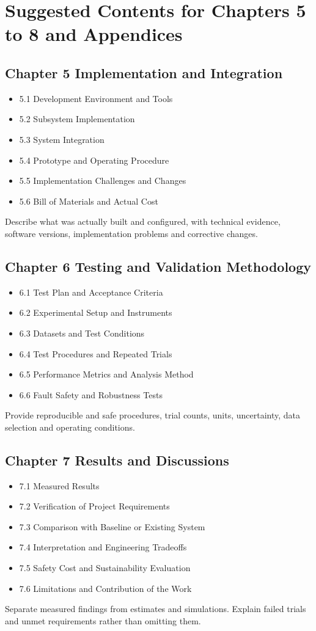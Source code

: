 \documentclass[11pt,a4paper]{article}
\newcommand{\Page}[1]{\clearpage\section*{#1}}
\begin{document}
\Page{Suggested Contents for Chapters 5 to 8 and Appendices}
\subsection*{Chapter 5 Implementation and Integration}
\begin{itemize}
\item 5.1 Development Environment and Tools
\item 5.2 Subsystem Implementation
\item 5.3 System Integration
\item 5.4 Prototype and Operating Procedure
\item 5.5 Implementation Challenges and Changes
\item 5.6 Bill of Materials and Actual Cost
\end{itemize}
Describe what was actually built and configured, with technical evidence,
software versions, implementation problems and corrective changes.

\subsection*{Chapter 6 Testing and Validation Methodology}
\begin{itemize}
\item 6.1 Test Plan and Acceptance Criteria
\item 6.2 Experimental Setup and Instruments
\item 6.3 Datasets and Test Conditions
\item 6.4 Test Procedures and Repeated Trials
\item 6.5 Performance Metrics and Analysis Method
\item 6.6 Fault Safety and Robustness Tests
\end{itemize}
Provide reproducible and safe procedures, trial counts, units, uncertainty,
data selection and operating conditions.

\subsection*{Chapter 7 Results and Discussions}
\begin{itemize}
\item 7.1 Measured Results
\item 7.2 Verification of Project Requirements
\item 7.3 Comparison with Baseline or Existing System
\item 7.4 Interpretation and Engineering Tradeoffs
\item 7.5 Safety Cost and Sustainability Evaluation
\item 7.6 Limitations and Contribution of the Work
\end{itemize}
Separate measured findings from estimates and simulations. Explain failed trials
and unmet requirements rather than omitting them.
\end{document}
